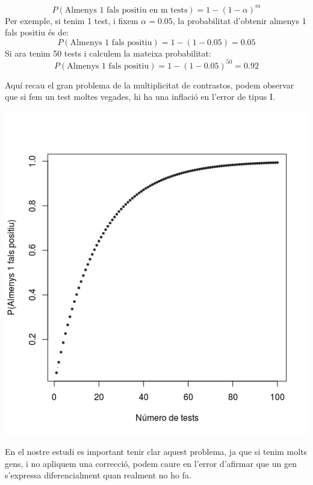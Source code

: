 \documentclass[english]{article}
\begin{document}
\begin{equation*}
P(\text{Almenys 1 fals positiu en m tests}) = 1 - (1 - \alpha)^m
\end{equation*}
Per exemple, si tenim 1 test, i fixem $\alpha=0.05$, la probabilitat d'obtenir almenys 1 fals positiu és de:
\begin{equation*}
P(\text{Almenys 1 fals positiu}) = 1-(1-0.05)= 0.05
\end{equation*}
Si ara tenim 50 tests i calculem la mateixa probabilitat:
\begin{equation*}
P(\text{Almenys 1 fals positiu}) = 1-(1-0.05)^{50}= 0.92
\end{equation*}

Aquí recau el gran problema de la multiplicitat de contrastos, podem observar que si fem un test moltes vegades, hi ha una inflació en l'error de tipus I.
\begin{center}
\includegraphics[scale=0.5]{FalsPositiu.png}
\end{center}
En el nostre estudi es important tenir clar aquest problema, ja que si tenim molts gens, i no apliquem una correcció, podem caure en l'error d'afirmar que un gen s'expressa diferencialment quan realment no ho fa.
\end{document}
